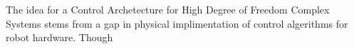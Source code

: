 The idea for a Control Archetecture for High Degree of Freedom Complex Systems stems from a gap in physical implimentation of control algerithms for robot hardware.
Though 
